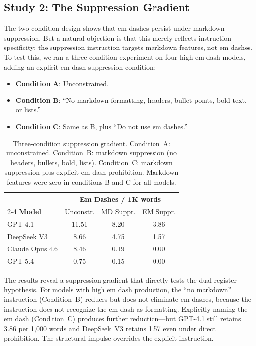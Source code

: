 \subsection{Study 2: The Suppression Gradient}

The two-condition design shows that em dashes persist under markdown suppression. But a natural objection is that this merely reflects instruction specificity: the suppression instruction targets markdown features, not em dashes. To test this, we ran a three-condition experiment on four high-em-dash models, adding an explicit em dash suppression condition:

\begin{itemize}[leftmargin=*]
\item \textbf{Condition A}: Unconstrained.
\item \textbf{Condition B}: ``No markdown formatting, headers, bullet points, bold text, or lists.''
\item \textbf{Condition C}: Same as B, plus ``Do not use em dashes.''
\end{itemize}

\begin{table}[ht]
\centering
\small
\begin{tabular}{lccc}
\toprule
& \multicolumn{3}{c}{\textbf{Em Dashes / 1K words}} \\
\cmidrule(lr){2-4}
\textbf{Model} & Unconstr. & MD Suppr. & EM Suppr. \\
\midrule
GPT-4.1         & 11.51 & 8.20 & 3.86 \\
DeepSeek V3     &  8.66 & 4.75 & 1.57 \\
Claude Opus 4.6 &  8.46 & 0.19 & 0.00 \\
GPT-5.4         &  0.75 & 0.15 & 0.00 \\
\bottomrule
\end{tabular}
\caption{Three-condition suppression gradient. Condition~A: unconstrained. Condition~B: markdown suppression (no headers, bullets, bold, lists). Condition~C: markdown suppression plus explicit em dash prohibition. Markdown features were zero in conditions B and C for all models.}
\label{tab:gradient}
\end{table}

The results reveal a suppression gradient that directly tests the dual-register hypothesis. For models with high em dash production, the ``no markdown'' instruction (Condition~B) reduces but does not eliminate em dashes, because the instruction does not recognize the em dash as formatting. Explicitly naming the em dash (Condition~C) produces further reduction---but GPT-4.1 still retains 3.86 per 1,000 words and DeepSeek~V3 retains 1.57 even under direct prohibition. The structural impulse overrides the explicit instruction.

